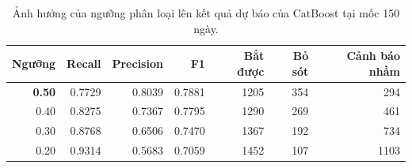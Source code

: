 \begin{table}[H]
  \centering
  \caption{Ảnh hưởng của ngưỡng phân loại lên kết quả dự báo của CatBoost tại mốc 150 ngày.}
  \label{tab:threshold}
  \small
  \begin{tabular}{rrrrrrr}
    \toprule
    \textbf{Ngưỡng} & \textbf{Recall} & \textbf{Precision} & \textbf{F1} & \textbf{Bắt được} & \textbf{Bỏ sót} & \textbf{Cảnh báo nhầm} \\
    \midrule
    \textbf{0.50} & 0.7729 & 0.8039 & 0.7881 & 1205 & 354 & 294 \\
    0.40 & 0.8275 & 0.7367 & 0.7795 & 1290 & 269 & 461 \\
    0.30 & 0.8768 & 0.6506 & 0.7470 & 1367 & 192 & 734 \\
    0.20 & 0.9314 & 0.5683 & 0.7059 & 1452 & 107 & 1103 \\
    \bottomrule
  \end{tabular}
\end{table}
